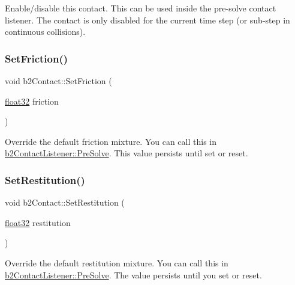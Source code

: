 Enable/disable this contact. This can be used inside the pre-\/solve contact listener. The contact is only disabled for the current time step (or sub-\/step in continuous collisions). \mbox{\label{classb2_contact_a5e8fbb6bb2966ac84272bb0ea9d2e4c7}} 
\subsubsection{\texorpdfstring{SetFriction()}{SetFriction()}}
{\footnotesize\ttfamily void b2\+Contact\+::\+Set\+Friction (\begin{DoxyParamCaption}\item[{\mbox{\hyperlink{b2_settings_8h_aacdc525d6f7bddb3ae95d5c311bd06a1}{float32}}}]{friction }\end{DoxyParamCaption})\hspace{0.3cm}{\ttfamily [inline]}}

Override the default friction mixture. You can call this in \mbox{\hyperlink{classb2_contact_listener_a416f85eb45a1099053402b15a19a7de0}{b2\+Contact\+Listener\+::\+Pre\+Solve}}. This value persists until set or reset. \mbox{\label{classb2_contact_a24ca342c2bb766c53ef5ad04f5268fc1}} 
\subsubsection{\texorpdfstring{SetRestitution()}{SetRestitution()}}
{\footnotesize\ttfamily void b2\+Contact\+::\+Set\+Restitution (\begin{DoxyParamCaption}\item[{\mbox{\hyperlink{b2_settings_8h_aacdc525d6f7bddb3ae95d5c311bd06a1}{float32}}}]{restitution }\end{DoxyParamCaption})\hspace{0.3cm}{\ttfamily [inline]}}

Override the default restitution mixture. You can call this in \mbox{\hyperlink{classb2_contact_listener_a416f85eb45a1099053402b15a19a7de0}{b2\+Contact\+Listener\+::\+Pre\+Solve}}. The value persists until you set or reset. \mbox{\label{classb2_contact_a32033914a6c7f35b469e8fddbc17c566}} 
